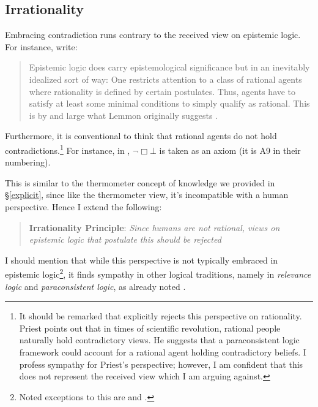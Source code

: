 \documentclass[11pt]{article}
\numberwithin{equation}{subsection}
\begin{document}
\subsection{Irrationality}\label{irrational}

Embracing contradiction runs contrary to the received view on epistemic logic.  For instance, \citet{hendricks_wheresbridge?_2006} write:
\begin{quote}
{ Epistemic logic does carry epistemological significance
 but in an inevitably idealized sort of way: One restricts attention to a
class of rational agents where rationality is defined by certain
postulates. Thus, agents have to satisfy at least some minimal
conditions to simply qualify as rational. This is by and large
what Lemmon originally suggests \citep{lemmon_symposium:_1959}.}
\end{quote}
Furthermore, it is conventional to think that rational agents do not hold contradictions.\footnote{It should be remarked that \citet{priest_doubt_2006} explicitly rejects this perspective on rationality.  Priest points out that in times of scientific revolution, rational people naturally hold contradictory views. He suggests that a paraconsistent logic framework could account for a rational agent holding contradictory beliefs.  I profess sympathy for Priest's perspective; however, I am confident that this does not represent the received view which I am arguing against.}  For instance, in \citep{kraus_knowledge_1986}, $\neg \Box \bot$ is taken as an axiom (it is A9 in their numbering).

This is similar to the thermometer concept of knowledge we provided in \S\ref{explicit}, since like the thermometer view, it's incompatible with a human perspective.  Hence I extend the following:

\begin{quote}
 \textbf{Irrationality Principle}: \emph{Since humans are not rational, views on epistemic logic that postulate this should be rejected}
\end{quote}

I should mention that while this perspective is not typically embraced in epistemic logic\footnote{Noted exceptions to this are \citet{rantala_impossible_1982} and \citet{levesque_logic_1984}.}, it finds sympathy in other logical traditions, namely in \emph{relevance logic} and \emph{paraconsistent logic}, as already noted \citep[see][chapters 1 \& 4]{gabbay_handbook_2002}.
\end{document}
